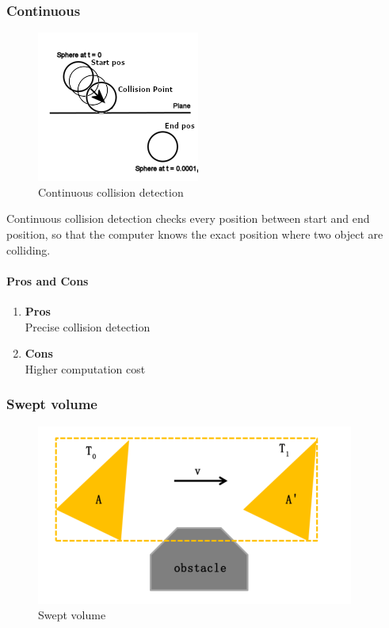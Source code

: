 \documentclass{article}
\begin{document}
    \subsubsection{Continuous}

    \begin{figure}[H]
        \includegraphics{ContinuousCollision}
        \centering
        \caption{Continuous collision detection}
        \label{fig:continuous}
    \end{figure}

    Continuous collision detection checks every position between start and end position, so that the computer knows the exact position where two object are colliding.

    \paragraph{Pros and Cons}
    \begin{enumerate}
        \item \textbf{Pros}\\
        Precise collision detection
        \item \textbf{Cons}\\
        Higher computation cost
    \end{enumerate}

    \subsubsection{Swept volume}

    \begin{figure}[H]
        \centering
        \includegraphics[width=1\linewidth]{SweptVolume}
        \caption{Swept volume}
        \label{fig:sweptvolume}
    \end{figure}
\end{document}
